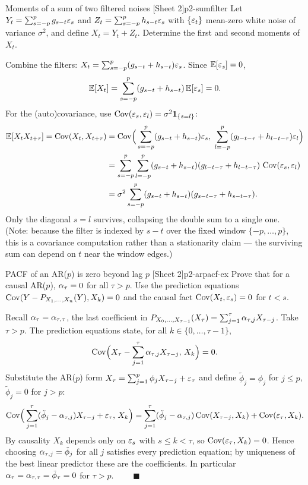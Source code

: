 \begin{exercise}{Moments of a sum of two filtered noises \quad\textnormal{[Sheet 2]}}{p2-sumfilter}
Let $Y_t=\sum_{s=-p}^{p}g_{s-t}\varepsilon_s$ and $Z_t=\sum_{s=-p}^{p}h_{s-t}\varepsilon_s$ with
$\{\varepsilon_t\}$ mean-zero white noise of variance $\sigma^2$, and define
$X_t=Y_t+Z_t$. Determine the first and second moments of $X_t$.
\end{exercise}
\begin{solution}
Combine the filters: $X_t=\sum_{s=-p}^{p}(g_{s-t}+h_{s-t})\varepsilon_s$. Since
$\mathbb{E}[\varepsilon_s]=0$,
\[
\mathbb{E}[X_t]=\sum_{s=-p}^{p}(g_{s-t}+h_{s-t})\,\mathbb{E}[\varepsilon_s]=0 .
\]
For the (auto)covariance, use $\operatorname{Cov}(\varepsilon_s,\varepsilon_l)=\sigma^2\mathbf{1}_{\{s=l\}}$:
\[
\begin{aligned}
\mathbb{E}[X_t X_{t+\tau}]=\operatorname{Cov}(X_t,X_{t+\tau})
&=\operatorname{Cov}\!\Big(\sum_{s=-p}^{p}(g_{s-t}+h_{s-t})\varepsilon_s,\
            \sum_{l=-p}^{p}(g_{l-t-\tau}+h_{l-t-\tau})\varepsilon_l\Big)\\
&=\sum_{s=-p}^{p}\sum_{l=-p}^{p}(g_{s-t}+h_{s-t})(g_{l-t-\tau}+h_{l-t-\tau})\,
   \operatorname{Cov}(\varepsilon_s,\varepsilon_l)\\
&=\sigma^2\sum_{s=-p}^{p}(g_{s-t}+h_{s-t})(g_{s-t-\tau}+h_{s-t-\tau}).
\end{aligned}
\]
Only the diagonal $s=l$ survives, collapsing the double sum to a single one.
(Note: because the filter is indexed by $s-t$ over the fixed window
$\{-p,\dots,p\}$, this is a covariance computation rather than a stationarity
claim --- the surviving sum can depend on $t$ near the window edges.)
\end{solution}

\begin{exercise}{PACF of an AR($p$) is zero beyond lag $p$ \quad\textnormal{[Sheet 2]}}{p2-arpacf-ex}
Prove that for a causal AR($p$), $\alpha_\tau=0$ for all $\tau>p$. Use the
prediction equations
$\operatorname{Cov}(Y-P_{X_1,\dots,X_n}(Y),X_k)=0$ and the causal fact
$\operatorname{Cov}(X_t,\varepsilon_s)=0$ for $t<s$.
\end{exercise}
\begin{solution}
Recall $\alpha_\tau=\alpha_{\tau,\tau}$, the last coefficient in
$P_{X_0,\dots,X_{\tau-1}}(X_\tau)=\sum_{j=1}^{\tau}\alpha_{\tau,j}X_{\tau-j}$.
Take $\tau>p$. The prediction equations state, for all
$k\in\{0,\dots,\tau-1\}$,
\[
\operatorname{Cov}\!\Big(X_\tau-\sum_{j=1}^{\tau}\alpha_{\tau,j}X_{\tau-j},\,X_k\Big)=0 .
\]
Substitute the AR($p$) form $X_\tau=\sum_{j=1}^{p}\phi_j X_{\tau-j}+\varepsilon_\tau$
and define $\tilde\phi_j=\phi_j$ for $j\le p$, $\tilde\phi_j=0$ for $j>p$:
\[
\operatorname{Cov}\!\Big(\sum_{j=1}^{\tau}(\tilde\phi_j-\alpha_{\tau,j})X_{\tau-j}+\varepsilon_\tau,\,X_k\Big)
=\sum_{j=1}^{\tau}(\tilde\phi_j-\alpha_{\tau,j})\operatorname{Cov}(X_{\tau-j},X_k)
+\operatorname{Cov}(\varepsilon_\tau,X_k).
\]
By causality $X_k$ depends only on $\varepsilon_s$ with $s\le k<\tau$, so
$\operatorname{Cov}(\varepsilon_\tau,X_k)=0$. Hence choosing $\alpha_{\tau,j}=\tilde\phi_j$ for all $j$
satisfies every prediction equation; by uniqueness of the best linear predictor
these are the coefficients. In particular
$\alpha_\tau=\alpha_{\tau,\tau}=\tilde\phi_\tau=0$ for $\tau>p$. $\qquad\blacksquare$
\end{solution}

